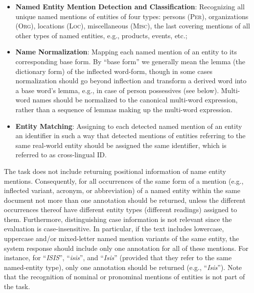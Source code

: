 \documentclass[11pt]{article}
\begin{document}
\begin{itemize}

\item \textbf{Named Entity Mention Detection and Classification}:
  Recognizing all unique named mentions of entities of four types:
  persons (\textsc{Per}), organizations (\textsc{Org}), locations (\textsc{Loc}), miscellaneous
  (\textsc{Misc}), the last covering mentions of all other types of named
  entities, e.g., products, events, etc.;

\item \textbf{Name Normalization}: {Mapping each named mention of
    an entity to its corresponding base form. By ``base form'' we
    generally mean the lemma (the dictionary form) of the inflected
    word-form, though in some cases normalization should go beyond
    inflection and transform a derived word into a base word's lemma,
    e.g., in case of person possessives (see below).  Multi-word names
    should be normalized to the canonical multi-word expression, rather
    than a sequence of lemmas making up the multi-word expression.}

\item \textbf{Entity Matching}: Assigning to each detected named mention
  of an entity an identifier in such a way that detected mentions of
  entities referring to the same real-world entity should be assigned the
  same identifier, which is referred to as cross-lingual ID.

\end{itemize}

\noindent The task does not include returning positional information of name
entity mentions. Consequently, for all occurrences of the same form of a
mention (e.g., inflected variant, acronym, or abbreviation) of a named entity
within the same document not more than one annotation should be returned,
unless the different occurrences thereof have different entity types (different
readings) assigned to them. Furthermore, distinguishing case information is not
relevant since the evaluation is case-insensitive. In particular, if the text
includes lowercase, uppercase and/or mixed-letter named mention variants of the
same entity, the system response should include only one annotation for all of
these mentions.  For instance, for ``\textit{ISIS}'', ``\textit{isis}'', and
``\textit{Isis}'' (provided that they refer to the same named-entity type),
only one annotation should be returned (e.g., ``\textit{Isis}''). Note that the
recognition of nominal or pronominal mentions of entities is not part of the
task. 
\end{document}
